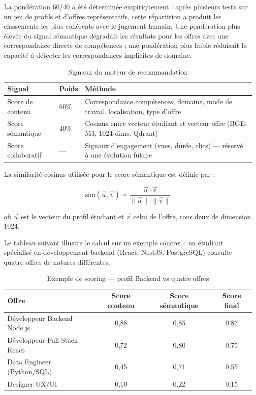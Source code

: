 ﻿\documentclass[12pt,a4paper]{report}
\begin{document}
La pondération 60/40 a été déterminée empiriquement : après plusieurs tests sur un jeu de profils et d'offres représentatifs, cette répartition a produit les classements les plus cohérents avec le jugement humain. Une pondération plus élevée du signal sémantique dégradait les résultats pour les offres avec une correspondance directe de compétences ; une pondération plus faible réduisait la capacité à détecter les correspondances implicites de domaine.

\begin{table}[H]
\centering
\begin{tabularx}{\textwidth}{llX}
\toprule
\textbf{Signal} & \textbf{Poids} & \textbf{Méthode} \\
\midrule
Score de contenu & 60\% & Correspondance compétences, domaine, mode de travail, localisation, type d'offre \\
Score sémantique & 40\% & Cosinus entre vecteur étudiant et vecteur offre (BGE-M3, 1024 dims, Qdrant) \\
Score collaboratif & — & Signaux d'engagement (vues, durée, clics) — réservé à une évolution future \\
\bottomrule
\end{tabularx}
\caption{Signaux du moteur de recommandation}
\end{table}

La similarité cosinus utilisée pour le score sémantique est définie par :

\begin{equation}
\text{sim}(\vec{u},\vec{v}) = \frac{\vec{u} \cdot \vec{v}}{\|\vec{u}\| \cdot \|\vec{v}\|}
\label{eq:cosine}
\end{equation}

où $\vec{u}$ est le vecteur du profil étudiant et $\vec{v}$ celui de l'offre, tous deux de dimension 1024.

Le tableau suivant illustre le calcul sur un exemple concret : un étudiant spécialisé en développement backend (React, NestJS, PostgreSQL) consulte quatre offres de natures différentes.

\begin{table}[H]
\centering
\begin{tabular}{lccc}
\toprule
\textbf{Offre} & \textbf{Score contenu} & \textbf{Score sémantique} & \textbf{Score final} \\
\midrule
Développeur Backend Node.js  & 0,88 & 0,85 & 0,87 \\
Développeur Full-Stack React & 0,72 & 0,80 & 0,75 \\
Data Engineer (Python/SQL)   & 0,45 & 0,71 & 0,55 \\
Designer UX/UI               & 0,10 & 0,22 & 0,15 \\
\bottomrule
\end{tabular}
\caption{Exemple de scoring — profil Backend vs quatre offres}
\end{table}
\end{document}
